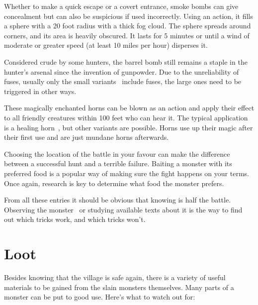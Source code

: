 Whether to make a quick escape or a covert entrance, smoke bombs can give concealment but can also be suspicious if used incorrectly. Using an action, it fills a sphere with a 20 foot radius with a thick fog cloud. The sphere spreads around corners, and its area is heavily obscured. It lasts for 5 minutes or until a wind of moderate or greater speed (at least 10 miles per hour) disperses it.

Considered crude by some hunters, the barrel bomb still remains a staple in the hunter's arsenal since the invention of gunpowder. Due to the unreliability of fuses, usually only the small variants~ include fuses, the large ones need to be triggered in other ways.

These magically enchanted horns can be blown as an action and apply their effect to all friendly creatures within 100 feet who can hear it. The typical application is a healing horn~, but other variants are possible. Horns use up their magic after their first use and are just mundane horns afterwards.

Choosing the location of the battle in your favour can make the difference between a successful hunt and a terrible failure. Baiting a monster with its preferred food is a popular way of making sure the fight happens on your terms. Once again, research is key to determine what food the monster prefers.

From all these entries it should be obvious that knowing is half the battle. Observing the monster~ or studying available texts about it is the way to find out which tricks work, and which tricks won't.


\section{Loot}

Besides knowing that the village is safe again, there is a variety of useful materials to be gained from the slain monsters themselves. Many parts of a monster can be put to good use. Here's what to watch out for:

